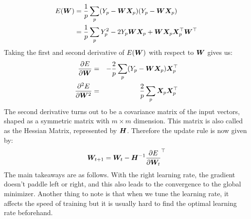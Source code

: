 \begin{align*}
E(\vect{W}) &=\frac{1}{p}\sum_{p}(Y_{p} - \vect{W}\vect{X}_{p})(Y_{p} - \vect{W}\vect{X}_{p})\\
&= \frac{1}{p}\sum_{p}Y_{p}^2 - 2Y_{p}\vect{W}\vect{X}_{p} + \vect{W}\vect{X}_{p} \vect{X}_p^{\top}\vect{W}^\top
\end{align*}
Taking the first and second derivative of $E(\vect{W})$ with respect to $\vect{W}$ gives us:
\begin{eqnarray*}
\frac{\partial E}{\partial \vect{W}} &=& -\frac{2}{p}\sum_{p}(Y_{p} - \vect{W}\vect{X}_{p}) \vect{X}_{p}^\top\\
\frac{\partial^2 E}{\partial \vect{W}^2} &=&  \frac{2}{p}\sum_{p}\vect{X}_{p}\vect{X}_{p}^\top
\end{eqnarray*}
The second derivative turns out to be a covariance matrix of the input vectors, shaped as a symmetric matrix with $m \times m$ dimension. This matrix is also called as the Hessian Matrix, represented by $\matr{H}$. Therefore the update rule is now given by:
$$ \vect{W}_{t+1} = \vect{W}_t - \matr{H}^{-1}\frac{\partial E}{\partial \vect{W}_t}^{\top} $$
The main takeaways are as follows. With the right learning rate, the gradient doesn't paddle left or right, and this also leads to the convergence to the global minimizer. Another thing to note is that when we tune the learning rate, it affects the speed of training but it is usually hard to find the optimal learning rate beforehand.
